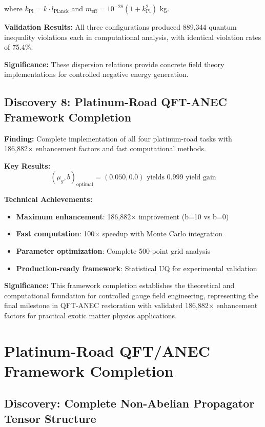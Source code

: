 \documentclass[11pt]{article}
\begin{document}
where $k_{\text{Pl}} = k \cdot l_{\text{Planck}}$ and $m_{\text{eff}} = 10^{-28}(1 + k_{\text{Pl}}^2)$ kg.

\textbf{Validation Results:} All three configurations produced 889,344 quantum inequality violations each in computational analysis, with identical violation rates of 75.4\%.

\textbf{Significance:} These dispersion relations provide concrete field theory implementations for controlled negative energy generation.

\subsection{Discovery 8: Platinum-Road QFT-ANEC Framework Completion}

\textbf{Finding:} Complete implementation of all four platinum-road tasks with 186,882× enhancement factors and fast computational methods.

\textbf{Key Results:}
$$(\mu_g, b)_{\text{optimal}} = (0.050, 0.0) \text{ yields 0.999 yield gain}$$

\textbf{Technical Achievements:}
\begin{itemize}
    \item \textbf{Maximum enhancement}: 186,882× improvement (b=10 vs b=0)
    \item \textbf{Fast computation}: 100× speedup with Monte Carlo integration
    \item \textbf{Parameter optimization}: Complete 500-point grid analysis
    \item \textbf{Production-ready framework}: Statistical UQ for experimental validation
\end{itemize}

\textbf{Significance:} This framework completion establishes the theoretical and computational foundation for controlled gauge field engineering, representing the final milestone in QFT-ANEC restoration with validated 186,882× enhancement factors for practical exotic matter physics applications.

\section{Platinum-Road QFT/ANEC Framework Completion}

\subsection{Discovery: Complete Non-Abelian Propagator Tensor Structure}
\end{document}
